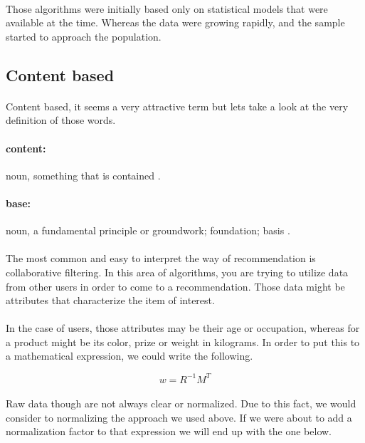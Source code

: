 \paragraph{} Those algorithms were initially based only on statistical models that were available at the time. Whereas the data were growing rapidly, and the sample started to approach the population.
\subsection{Content based}
\paragraph{} Content based, it seems a very attractive term but lets take a look at the very definition of those words.
\paragraph{content:} noun, something that is contained \cite{Dictionary.com2017}.
\paragraph{base:} noun, a fundamental principle or groundwork; foundation; basis \cite{Dictionary.com2017}.

\paragraph{}The most common and easy to interpret the way of recommendation is collaborative filtering. In this area of algorithms, you are trying to utilize data from other users in order to come to a recommendation. Those data might be attributes that characterize the item of interest. 
\paragraph{}In the case of users, those attributes may be their age or occupation, whereas for a product might be its color, prize or weight in kilograms. In order to put this to a mathematical expression, we could write the following.

\begin{equation}
w=R^{-1}M^{T}
\end{equation}

\paragraph{}Raw data though are not always clear or normalized. Due to this fact, we would consider to normalizing the approach we used above. If we were about to add a normalization factor to that expression we will end up with the one below.

